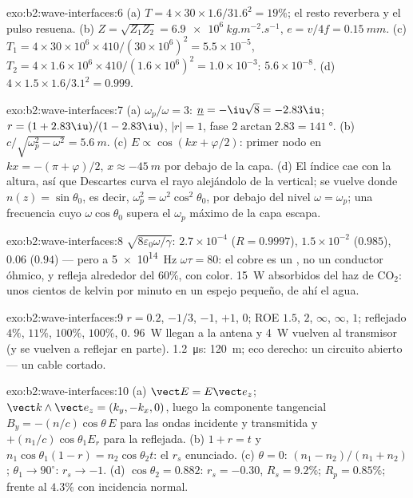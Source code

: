 \begin{solution}{exo:b2:wave-interfaces:6}
(a) $T = 4 \times 30 \times 1.6/31.6^2 = 19\%$; el resto reverbera y el pulso
resuena. (b) $Z = \sqrt{Z_1Z_2} = \qty{6.9e6}{kg.m^{-2}.s^{-1}}$, $e = v/4f = \qty{0.15}{mm}$.
(c) $T_1 = 4 \times 30 \times 10^6 \times 410/(30 \times 10^6)^2 = 5.5 \times 10^{-5}$, $T_2 = 4 \times 1.6 \times
10^6 \times 410/(1.6 \times 10^6)^2 = 1.0 \times 10^{-3}$: $5.6 \times 10^{-8}$. (d) $4 \times 1.5 \times 1.6/
3.1^2 = 0.999$.
\end{solution}

\begin{solution}{exo:b2:wave-interfaces:7}
(a) $\omega_p/\omega = 3$: $\underline n = -\iu\sqrt8 = -2.83\iu$; $r = (1 + 2.83\iu)/(1 - 2.83
\iu)$, $|r| = 1$, fase $2\arctan2.83 = \qty{141}{\degree}$. (b) $c/\sqrt{\omega_p^2 - \omega^2}
= \qty{5.6}{m}$. (c) $E \propto \cos(kx + \varphi/2)$: primer nodo en $kx = -(\pi + \varphi)/2$,
$x \approx \qty{-45}{m}$ por debajo de la capa. (d) El índice cae con la altura, así que
Descartes curva el rayo alejándolo de la vertical; se vuelve donde
$n(z) = \sin\theta_0$, es decir, $\omega_p^2 = \omega^2\cos^2\theta_0$, por debajo del nivel $\omega = \omega_p$;
una frecuencia cuyo $\omega\cos\theta_0$ supera el $\omega_p$ máximo de la capa
escapa.
\end{solution}

\begin{solution}{exo:b2:wave-interfaces:8}
$\sqrt{8\varepsilon_0\omega/\gamma}$: $2.7 \times 10^{-4}$ ($R = 0.9997$), $1.5 \times 10^{-2}$ ($0.985$),
$0.06$ ($0.94$) --- pero a \qty{5e14}{Hz} $\omega\tau = 80$: el cobre es un ,
no un conductor óhmico, y refleja alrededor del $60\%$, con color. \qty{15}{W}
absorbidos del haz de CO$_2$: unos cientos de kelvin por minuto en un
espejo pequeño, de ahí el agua.
\end{solution}

\begin{solution}{exo:b2:wave-interfaces:9}
$r = 0.2$, $-1/3$, $-1$, $+1$, $0$; ROE $1.5$, $2$, $\infty$, $\infty$, $1$; reflejado
$4\%$, $11\%$, $100\%$, $100\%$, $0$. \qty{96}{W} llegan a la antena y \qty{4}{W}
vuelven al transmisor (y se vuelven a reflejar en parte). \qty{1.2}{\micro s}:
\qty{120}{m}; eco derecho: un circuito abierto --- un cable cortado.
\end{solution}

\begin{solution}{exo:b2:wave-interfaces:10}
(a) $\vect E = E\vect e_z$; $\vect k\wedge\vect e_z = (k_y, -k_x, 0)$, luego la componente tangencial
$B_y = -(n/c)\cos\theta\,E$ para las ondas incidente y transmitida y
$+(n_1/c)\cos\theta_1E_r$ para la reflejada. (b) $1 + r = t$ y $n_1\cos\theta_1
(1 - r) = n_2\cos\theta_2t$: el $r_s$ enunciado. (c) $\theta = 0$: $(n_1 - n_2)/(n_1 +
n_2)$; $\theta_1 \to 90^\circ$: $r_s \to -1$. (d) $\cos\theta_2 = 0.882$: $r_s = -0.30$, $R_s =
9.2\%$; $R_p = 0.85\%$; frente al $4.3\%$ con incidencia normal.
\end{solution}


